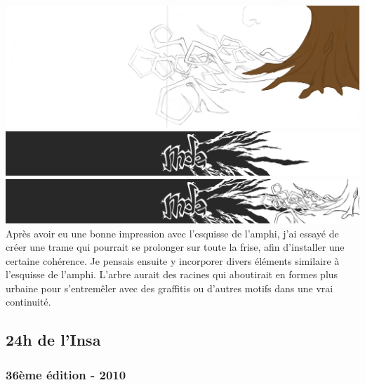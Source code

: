         \begin{center}
            \includegraphics[width=\textwidth]{img/arbre.png}
            \includegraphics[width=\textwidth]{img/mde.png}
            \includegraphics[width=\textwidth]{img/mde+arbre.png}
            Après avoir eu une bonne impression avec l'esquisse de l'amphi, j'ai essayé de créer une trame qui pourrait se prolonger sur toute la frise, afin d'installer une certaine cohérence.
Je pensais ensuite y incorporer divers éléments similaire à l'esquisse de l'amphi.
            L'arbre aurait des racines qui aboutirait en formes plus urbaine pour s'entremêler avec des graffitis ou d'autres motifs dans une vrai continuité.
        \end{center}
            
    \subsection{24h de l'Insa}
    
        \subsubsection{36ème édition - 2010}
    
